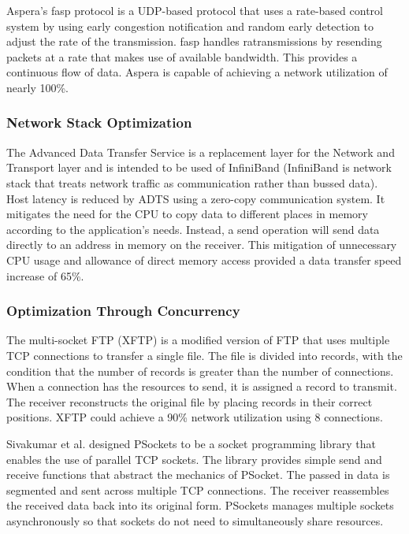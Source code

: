 Aspera's fasp protocol \cite{Aspera2016}\cite{Fan2010} is a UDP-based protocol that uses a rate-based control system by using early congestion notification and random early detection to adjust the rate of the transmission. fasp handles ratransmissions by resending packets at a rate that makes use of available bandwidth. This provides a continuous flow of data. Aspera is capable of achieving a network utilization of nearly 100\%.

\subsubsection{Network Stack Optimization}

The Advanced Data Transfer Service \cite{lai2009designing} is a replacement layer for the Network and Transport layer and is intended to be used of InfiniBand \cite{Pfister2001} (InfiniBand is network stack that treats network traffic as communication rather than bussed data). Host latency is reduced by ADTS using a zero-copy communication system. It mitigates the need for the CPU to copy data to different places in memory according to the application's needs. Instead, a send operation will send data directly to an address in memory on the receiver. This mitigation of unnecessary CPU usage and allowance of direct memory access provided a data transfer speed increase of 65\%.

\subsubsection{Optimization Through Concurrency}

The multi-socket FTP (XFTP) \cite{Allman1995}\cite{Allman1997} is a modified version of FTP \cite{postel1980user} that uses multiple TCP connections to transfer a single file. The file is divided into records, with the condition that the number of records is greater than the number of connections. When a connection has the resources to send, it is assigned a record to transmit. The receiver reconstructs the original file by placing records in their correct positions. XFTP could achieve a 90\% network utilization using 8 connections.

Sivakumar et al. designed PSockets \cite{Sivakumar2000psockets} to be a socket programming library that enables the use of parallel TCP sockets. The library provides simple send and receive functions that abstract the mechanics of PSocket. The passed in data is segmented and sent across multiple TCP connections. The receiver reassembles the received data back into its original form. PSockets manages multiple sockets asynchronously so that sockets do not need to simultaneously share resources. 


